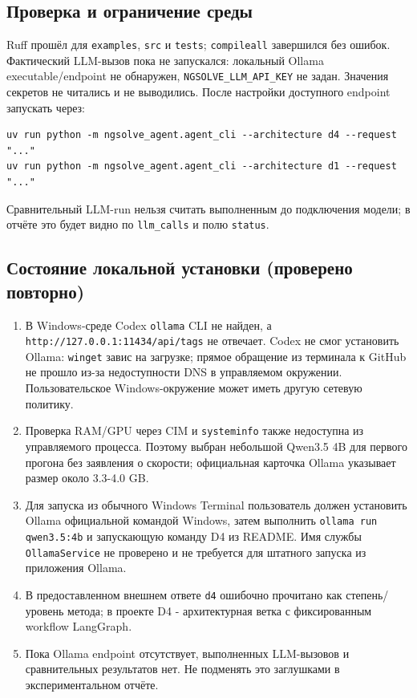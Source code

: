 \documentclass[11pt,a4paper]{article}
\begin{document}
\subsection{Проверка и ограничение среды}

Ruff прошёл для \texttt{examples}, \texttt{src} и \texttt{tests}; \texttt{compileall} завершился без ошибок. Фактический LLM-вызов пока не запускался: локальный Ollama executable/endpoint не обнаружен, \texttt{NGSOLVE\_LLM\_API\_KEY} не задан. Значения секретов не читались и не выводились. После настройки доступного endpoint запускать через:

\begin{lstlisting}
uv run python -m ngsolve_agent.agent_cli --architecture d4 --request "..."
uv run python -m ngsolve_agent.agent_cli --architecture d1 --request "..."
\end{lstlisting}

Сравнительный LLM-run нельзя считать выполненным до подключения модели; в отчёте это будет видно по \texttt{llm\_calls} и полю \texttt{status}.

\subsection{Состояние локальной установки (проверено повторно)}

\begin{enumerate}
    \item В Windows-среде Codex \texttt{ollama} CLI не найден, а \texttt{http://127.0.0.1:11434/api/tags} не отвечает. Codex не смог установить Ollama: \texttt{winget} завис на загрузке; прямое обращение из терминала к GitHub не прошло из-за недоступности DNS в управляемом окружении. Пользовательское Windows-окружение может иметь другую сетевую политику.
    \item Проверка RAM/GPU через CIM и \texttt{systeminfo} также недоступна из управляемого процесса. Поэтому выбран небольшой Qwen3.5 4B для первого прогона без заявления о скорости; официальная карточка Ollama указывает размер около 3.3-4.0 GB.
    \item Для запуска из обычного Windows Terminal пользователь должен установить Ollama официальной командой Windows, затем выполнить \texttt{ollama run qwen3.5:4b} и запускающую команду D4 из README. Имя службы \texttt{OllamaService} не проверено и не требуется для штатного запуска из приложения Ollama.
    \item В предоставленном внешнем ответе \texttt{d4} ошибочно прочитано как степень/уровень метода; в проекте D4 - архитектурная ветка с фиксированным workflow LangGraph.
    \item Пока Ollama endpoint отсутствует, выполненных LLM-вызовов и сравнительных результатов нет. Не подменять это заглушками в экспериментальном отчёте.
\end{enumerate}
\end{document}
